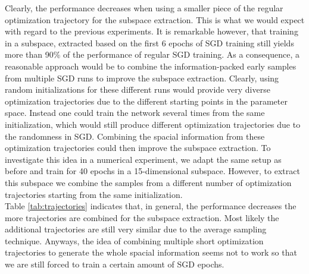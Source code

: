 \documentclass[11pt, a4paper]{article}
\begin{document}
Clearly, the performance decreases when using a smaller piece of the regular optimization trajectory for the subspace extraction. This is what we would expect with regard to the previous experiments. It is remarkable however, that training in a subspace, extracted based on the first 6 epochs of SGD training still yields more than 90\% of the performance of regular SGD training. As a consequence, a reasonable approach would be to combine the information-packed early samples from multiple SGD runs to improve the subspace extraction. Clearly, using random initializations for these different runs would provide very diverse optimization trajectories due to the different starting points in the parameter space. Instead one could train the network several times from the same initialization, which would still produce different optimization trajectories due to the randomness in SGD. Combining the spacial information from these optimization trajectories could then improve the subspace extraction. To investigate this idea in a numerical experiment, we adapt the same setup as before and train for 40 epochs in a 15-dimensional subspace. However, to extract this subspace we combine the samples from a different number of optimization trajectories starting from the same initialization. \\

Table \ref{tab:trajectories} indicates that, in general, the performance decreases the more trajectories are combined for the subspace extraction. Most likely the additional trajectories are still very similar due to the average sampling technique.  Anyways, the idea of combining multiple short optimization trajectories to generate the whole spacial information seems not to work so that we are still forced to train a certain amount of SGD epochs.
 
\end{document}
